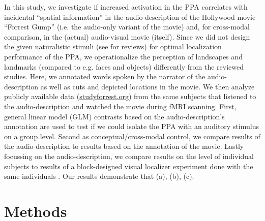 \documentclass[english]{article}
\begin{document}
In this study, we investigate if increased activation in the PPA correlates with
incidental ``spatial information'' in the audio-description of the Hollywood
movie ``Forrest Gump'' (i.e. the audio-only variant of the movie) and, for
cross-modal comparison, in the (actual) audio-visual movie (itself).
Since we did not design the given naturalistic stimuli (see
\citep{hamilton2018revolution, hasson2008neurocinematics,
sonkusare2019naturalistic} for reviews) for optimal localization performance of
the PPA, we operationalize the perception of landscapes and landmarks (compared
to e.g. faces and objects) differently from the reviewed studies.
Here, we annotated words spoken by the narrator of the audio-description as well
as cuts and depicted locations in the movie.
We then analyze publicly available data
(\href{http://www.studyforrest.org}{studyforrest.org}) from the same subjects
that listened to the audio-description and watched the movie during fMRI
scanning.
First, general linear model (GLM) contrasts based on the audio-description's
annotation are used to test if we could isolate the PPA with an auditory
stimulus on a group level.
Second as conceptual/cross-modal control, we compare results of the
audio-description to results based on the annotation of the movie.
Lastly focussing on the audio-description, we compare results on the level of
individual subjects to results of a block-designed visual localizer experiment
done with the same individuals \citep{sengupta2016extension}.
Our results demonstrate that (a), (b), (c).



\section{Methods}


\end{document}
